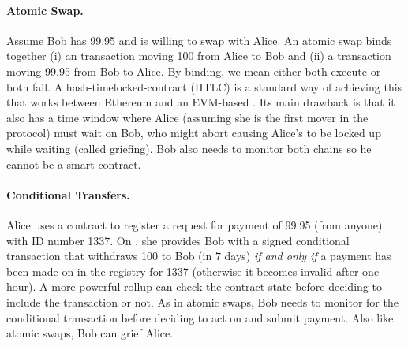 \paragraph{Atomic Swap.} Assume Bob has 99.95 \ethone and is willing to swap with Alice. An atomic swap binds together (i) an \layertwo transaction moving 100 \ethtwo from Alice to Bob and (ii) a \layerone transaction moving 99.95 \ethone from Bob to Alice. By binding, we mean either both execute or both fail. A hash-timelocked-contract (HTLC) is a standard way of achieving this that works between Ethereum and an EVM-based \layertwo. Its main drawback is that it also has a time window where Alice (assuming she is the first mover in the protocol) must wait on Bob, who might abort causing Alice's \ethtwo to be locked up while waiting (called griefing). Bob also needs to monitor both chains so he cannot be a smart contract. 

\paragraph{Conditional Transfers.} Alice uses a \layerone contract to register a request for payment of 99.95 \ethone (from anyone) with ID number 1337. On \layertwo,  she provides Bob with a signed conditional transaction that withdraws 100 \ethtwo to Bob (in 7 days) \textit{if and only if} a payment has been made on \layerone in the registry for 1337 (otherwise it becomes invalid after one hour). A more powerful rollup can check the \layerone contract state before deciding to include the \layertwo transaction or not. As in atomic swaps, Bob needs to monitor \layertwo for the conditional transaction before deciding to act on \layerone and submit payment. Also like atomic swaps, Bob can grief Alice.


